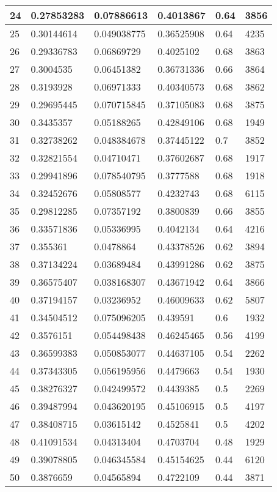 \begin{longtable}{|l|l|l|l|l|l|}
24 & 0.27853283 & 0.07886613 & 0.4013867 & 0.64 & 3856 \\ \hline 
25 & 0.30144614 & 0.049038775 & 0.36525908 & 0.64 & 4235 \\ \hline 
26 & 0.29336783 & 0.06869729 & 0.4025102 & 0.68 & 3863 \\ \hline 
27 & 0.3004535 & 0.06451382 & 0.36731336 & 0.66 & 3864 \\ \hline 
28 & 0.3193928 & 0.06971333 & 0.40340573 & 0.68 & 3862 \\ \hline 
29 & 0.29695445 & 0.070715845 & 0.37105083 & 0.68 & 3875 \\ \hline 
30 & 0.3435357 & 0.05188265 & 0.42849106 & 0.68 & 1949 \\ \hline 
31 & 0.32738262 & 0.048384678 & 0.37445122 & 0.7 & 3852 \\ \hline 
32 & 0.32821554 & 0.04710471 & 0.37602687 & 0.68 & 1917 \\ \hline 
33 & 0.29941896 & 0.078540795 & 0.3777588 & 0.68 & 1918 \\ \hline 
34 & 0.32452676 & 0.05808577 & 0.4232743 & 0.68 & 6115 \\ \hline 
35 & 0.29812285 & 0.07357192 & 0.3800839 & 0.66 & 3855 \\ \hline 
36 & 0.33571836 & 0.05336995 & 0.4042134 & 0.64 & 4216 \\ \hline 
37 & 0.355361 & 0.0478864 & 0.43378526 & 0.62 & 3894 \\ \hline 
38 & 0.37134224 & 0.03689484 & 0.43991286 & 0.62 & 3875 \\ \hline 
39 & 0.36575407 & 0.038168307 & 0.43671942 & 0.64 & 3866 \\ \hline 
40 & 0.37194157 & 0.03236952 & 0.46009633 & 0.62 & 5807 \\ \hline 
41 & 0.34504512 & 0.075096205 & 0.439591 & 0.6 & 1932 \\ \hline 
42 & 0.3576151 & 0.054498438 & 0.46245465 & 0.56 & 4199 \\ \hline 
43 & 0.36599383 & 0.050853077 & 0.44637105 & 0.54 & 2262 \\ \hline 
44 & 0.37343305 & 0.056195956 & 0.4479663 & 0.54 & 1930 \\ \hline 
45 & 0.38276327 & 0.042499572 & 0.4439385 & 0.5 & 2269 \\ \hline 
46 & 0.39487994 & 0.043620195 & 0.45106915 & 0.5 & 4197 \\ \hline 
47 & 0.38408715 & 0.03615142 & 0.4525841 & 0.5 & 4202 \\ \hline 
48 & 0.41091534 & 0.04313404 & 0.4703704 & 0.48 & 1929 \\ \hline 
49 & 0.39078805 & 0.046345584 & 0.45154625 & 0.44 & 6120 \\ \hline 
50 & 0.3876659 & 0.04565894 & 0.4722109 & 0.44 & 3871 \\ \hline 
\end{longtable}